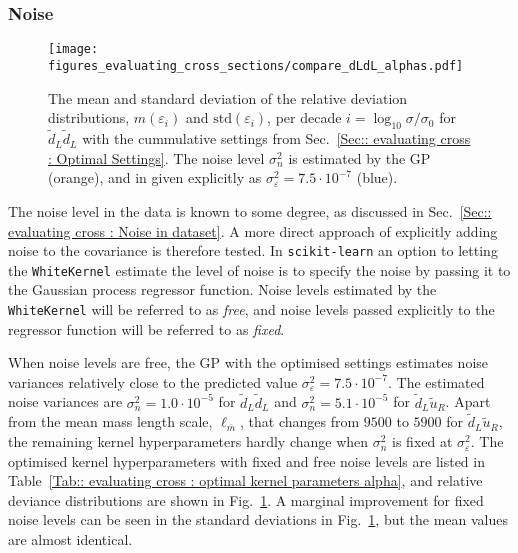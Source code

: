 \documentclass[twoside,english]{uiofysmaster}
\begin{document}
{{\subsubsection{Noise}

\begin{figure}
\centering
\texttt{[image: figures\_evaluating\_cross\_sections/compare\_dLdL\_alphas.pdf]}
\caption{The mean and standard deviation of the relative deviation distributions, $m(\varepsilon_i)$ and $\mathrm{std}(\varepsilon_i)$, per decade $i = \log_{10} \sigma /\sigma_0$ for $\widetilde{d}_L \widetilde{d}_L$ with the cummulative settings from Sec.~\ref{Sec:: evaluating cross : Optimal Settings}. The noise level $\sigma_n^2$ is estimated by the GP (orange), and in given explicitly as $\sigma_{\varepsilon}^2=7.5 \cdot 10^{-7}$ (blue).}
\label{Fig:: evaluating cross : errors distribution alpha vs no alpha optimal}
\end{figure}


The noise level in the data is known to some degree, as discussed in Sec.~\ref{Sec:: evaluating cross : Noise in dataset}. A more direct approach of explicitly adding noise to the covariance is therefore tested. In \verb|scikit-learn| an option to letting the \verb|WhiteKernel| estimate the level of noise is to specify the noise by passing it to the Gaussian process regressor function. Noise levels estimated by the \verb|WhiteKernel| will be referred to as \textit{free}, and noise levels passed explicitly to the regressor function will be referred to as \textit{fixed}.

When noise levels are free, the GP with the optimised settings estimates noise variances relatively close to the predicted value $\sigma_{\varepsilon}^2 = 7.5 \cdot 10^{-7}$. The estimated noise variances are $\sigma_n^2=1.0 \cdot 10^{-5}$ for $\widetilde{d}_L \widetilde{d}_L$ and $\sigma_n^2= 5.1 \cdot 10^{-5}$ for $\widetilde{d}_L \widetilde{u}_R$. Apart from the mean mass length scale, $\ell_{\bar{m}}$, that changes from $9500$ to $5900$ for $\widetilde{d}_L \widetilde{u}_R$, the remaining kernel hyperparameters hardly change when $\sigma_n^2$ is fixed at $\sigma_{\varepsilon}^2$. The optimised kernel hyperparameters with fixed and free noise levels are listed in Table~\ref{Tab:: evaluating cross : optimal kernel parameters alpha}, and relative deviance distributions are shown in Fig.~\ref{Fig:: evaluating cross : errors distribution alpha vs no alpha optimal}. A marginal improvement for fixed noise levels can be seen in the standard deviations in Fig.~\ref{Fig:: evaluating cross : errors distribution alpha vs no alpha optimal}, but the mean values are almost identical.

}}
\end{document}
